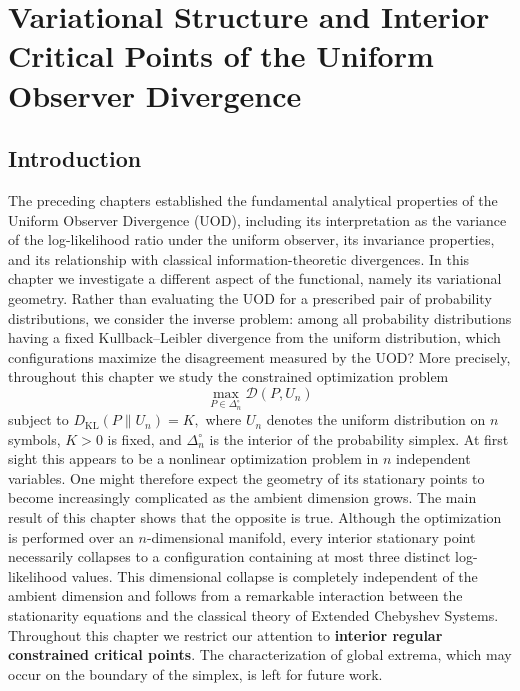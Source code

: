\chapter[Variational Structure]{Variational Structure and Interior Critical Points of the Uniform Observer Divergence}
\section{Introduction}
The preceding chapters established the fundamental analytical properties of the Uniform Observer Divergence (UOD), including its interpretation as the variance of the log-likelihood ratio under the uniform observer, its invariance properties, and its relationship with classical information-theoretic divergences.
In this chapter we investigate a different aspect of the functional, namely its variational geometry.
Rather than evaluating the UOD for a prescribed pair of probability distributions, we consider the inverse problem: among all probability distributions having a fixed Kullback--Leibler divergence from the uniform distribution, which configurations maximize the disagreement measured by the UOD?
More precisely, throughout this chapter we study the constrained optimization problem
\[
\max_{P\in\Delta_n^\circ}
\mathcal D(P,U_n)
\]
subject to
$D_{\mathrm{KL}}(P\|U_n)=K,$
where \(U_n\) denotes the uniform distribution on \(n\) symbols, \(K>0\) is fixed, and \(\Delta_n^\circ\) is the interior of the probability simplex.
At first sight this appears to be a nonlinear optimization problem in \(n\) independent variables. One might therefore expect the geometry of its stationary points to become increasingly complicated as the ambient dimension grows.
The main result of this chapter shows that the opposite is true.
Although the optimization is performed over an \(n\)-dimensional manifold, every interior stationary point necessarily collapses to a configuration containing at most three distinct log-likelihood values.
This dimensional collapse is completely independent of the ambient dimension and follows from a remarkable interaction between the stationarity equations and the classical theory of Extended Chebyshev Systems.
Throughout this chapter we restrict our attention to \textbf{interior regular constrained critical points}. The characterization of global extrema, which may occur on the boundary of the simplex, is left for future work.
